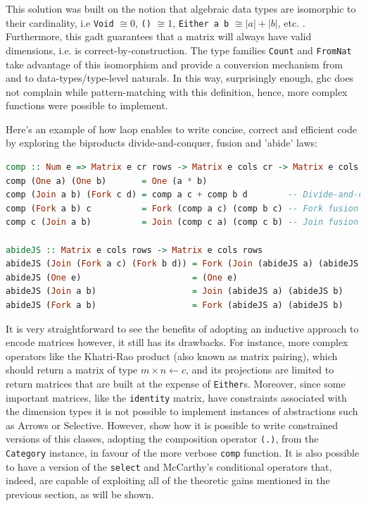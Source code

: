 \documentclass[
  oneside,
  11pt, a4paper,
  footinclude=true,
  headinclude=true,
  cleardoublepage=empty
]{scrbook}
\theoremstyle{definition}
\theoremstyle{definition}
\begin{document}
	    This solution was built on the notion that algebraic data types are isomorphic to their cardinality, i.e \texttt{Void} $ \cong 0$, \texttt{()} $\cong 1$, \texttt{Either a b} $\cong |a| + |b|$, etc. . Furthermore, this \gls{gadt} guarantees that a matrix will always have valid dimensions, i.e. is correct-by-construction. The type families \texttt{Count} and \texttt{FromNat} take advantage of this isomorphism and provide a conversion mechanism from and to data-types/type-level naturals. In this way, surprisingly enough, \gls{ghc} does not complain while pattern-matching with this definition, hence, more complex functions were possible to implement.
	    
	    Here's an example of how \gls{laop} enables to write concise, correct and efficient code by exploring the biproducts divide-and-conquer, fusion and 'abide' laws:
	    
        \begin{lstlisting}[language=Haskell, caption={Matrix composition and abiding functions},captionpos=b]
comp :: Num e => Matrix e cr rows -> Matrix e cols cr -> Matrix e cols rows
comp (One a) (One b)       = One (a * b)
comp (Join a b) (Fork c d) = comp a c + comp b d        -- Divide-and-conquer law
comp (Fork a b) c          = Fork (comp a c) (comp b c) -- Fork fusion law
comp c (Join a b)          = Join (comp c a) (comp c b) -- Join fusion law
        
abideJS :: Matrix e cols rows -> Matrix e cols rows
abideJS (Join (Fork a c) (Fork b d)) = Fork (Join (abideJS a) (abideJS b)) (Join (abideJS c) (abideJS d)) -- Join-Fork abide law
abideJS (One e)                      = (One e)
abideJS (Join a b)                   = Join (abideJS a) (abideJS b)
abideJS (Fork a b)                   = Fork (abideJS a) (abideJS b)
        \end{lstlisting}{}
        
        It is very straightforward to see the benefits of adopting an inductive approach to encode matrices however, it still has its drawbacks. For instance, more complex operators like the Khatri-Rao product (also known as matrix pairing), which should return a matrix of type $m \times n \leftarrow c$, and its projections are limited to return matrices that are built at the expense of \texttt{Either}s. Moreover, since some important matrices, like the \texttt{identity} matrix, have constraints associated with the dimension types it is not possible to implement instances of abstractions such as Arrows or Selective. However, \cite{10.1145/3406088.3409019} show how it is possible to write constrained versions of this classes, adopting the composition operator \texttt{(.)}, from the \texttt{Category} instance, in favour of the more verbose \texttt{comp} function. It is also possible to have a version of the \texttt{select} and McCarthy's conditional operators that, indeed, are capable of exploiting all of the theoretic gains mentioned in the previous section, as will be shown.
        
\end{document}
